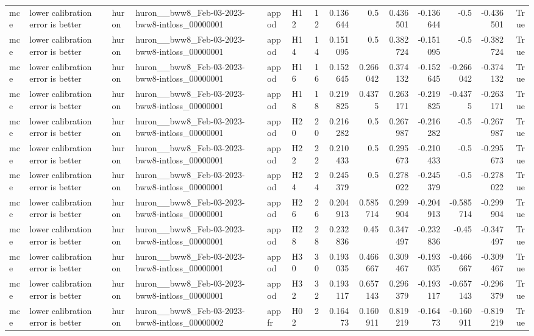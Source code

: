 \begin{longtable}{llllllrrrrrrrr}
mce & lower calibration error is better & huron & huron\_\_bww8\_Feb-03-2023-bww8-intloss\_00000001 & appod & H12 & 12 & 0.136644 & 0.5 & 0.436501 & -0.136644 & -0.5 & -0.436501 & True \\
mce & lower calibration error is better & huron & huron\_\_bww8\_Feb-03-2023-bww8-intloss\_00000001 & appod & H14 & 14 & 0.151095 & 0.5 & 0.382724 & -0.151095 & -0.5 & -0.382724 & True \\
mce & lower calibration error is better & huron & huron\_\_bww8\_Feb-03-2023-bww8-intloss\_00000001 & appod & H16 & 16 & 0.152645 & 0.266042 & 0.374132 & -0.152645 & -0.266042 & -0.374132 & True \\
mce & lower calibration error is better & huron & huron\_\_bww8\_Feb-03-2023-bww8-intloss\_00000001 & appod & H18 & 18 & 0.219825 & 0.4375 & 0.263171 & -0.219825 & -0.4375 & -0.263171 & True \\
mce & lower calibration error is better & huron & huron\_\_bww8\_Feb-03-2023-bww8-intloss\_00000001 & appod & H20 & 20 & 0.216282 & 0.5 & 0.267987 & -0.216282 & -0.5 & -0.267987 & True \\
mce & lower calibration error is better & huron & huron\_\_bww8\_Feb-03-2023-bww8-intloss\_00000001 & appod & H22 & 22 & 0.210433 & 0.5 & 0.295673 & -0.210433 & -0.5 & -0.295673 & True \\
mce & lower calibration error is better & huron & huron\_\_bww8\_Feb-03-2023-bww8-intloss\_00000001 & appod & H24 & 24 & 0.245379 & 0.5 & 0.278022 & -0.245379 & -0.5 & -0.278022 & True \\
mce & lower calibration error is better & huron & huron\_\_bww8\_Feb-03-2023-bww8-intloss\_00000001 & appod & H26 & 26 & 0.204913 & 0.585714 & 0.299904 & -0.204913 & -0.585714 & -0.299904 & True \\
mce & lower calibration error is better & huron & huron\_\_bww8\_Feb-03-2023-bww8-intloss\_00000001 & appod & H28 & 28 & 0.232836 & 0.45 & 0.347497 & -0.232836 & -0.45 & -0.347497 & True \\
mce & lower calibration error is better & huron & huron\_\_bww8\_Feb-03-2023-bww8-intloss\_00000001 & appod & H30 & 30 & 0.193035 & 0.466667 & 0.309467 & -0.193035 & -0.466667 & -0.309467 & True \\
mce & lower calibration error is better & huron & huron\_\_bww8\_Feb-03-2023-bww8-intloss\_00000001 & appod & H32 & 32 & 0.193117 & 0.657143 & 0.296379 & -0.193117 & -0.657143 & -0.296379 & True \\
mce & lower calibration error is better & huron & huron\_\_bww8\_Feb-03-2023-bww8-intloss\_00000002 & appfr & H02 & 2 & 0.16473 & 0.160911 & 0.819219 & -0.16473 & -0.160911 & -0.819219 & True \\

\end{longtable}
